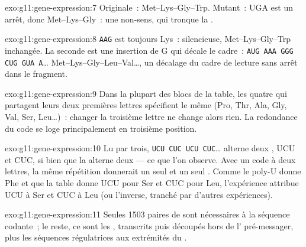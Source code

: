 \begin{solution}{exo:g11:gene-expression:7}
Originale~: Met--Lys--Gly--Trp. Mutant~: UGA est un arrêt, donc
Met--Lys--Gly~: une  non-sens, qui tronque la .
\end{solution}

\begin{solution}{exo:g11:gene-expression:8}
\texttt{AAG} est toujours Lys~: silencieuse, Met--Lys--Gly--Trp
inchangée. La seconde est une insertion de G qui décale le cadre~:
\texttt{AUG AAA GGG
CUG GUA A}\dots{} Met--Lys--Gly--Leu--Val\dots, un décalage du cadre de
lecture sans arrêt dans le fragment.
\end{solution}

\begin{solution}{exo:g11:gene-expression:9}
Dans la plupart des blocs de la table, les quatre  qui partagent
leurs deux premières lettres spécifient le même  (Pro, Thr,
Ala, Gly, Val, Ser, Leu\dots)~: changer la troisième lettre ne change
alors rien. La redondance du code se loge principalement en troisième
position.
\end{solution}

\begin{solution}{exo:g11:gene-expression:10}
Lu par trois, \texttt{UCU CUC UCU CUC}\dots{} alterne deux , UCU
et CUC, si bien que la  alterne deux  --- ce que
l'on observe. Avec un code à deux lettres, la même répétition donnerait
un seul  et un seul . Comme le poly-U donne Phe et que
la table donne UCU pour Ser et CUC pour Leu, l'expérience attribue UCU
à Ser et CUC à Leu (ou l'inverse, tranché par d'autres expériences).
\end{solution}

\begin{solution}{exo:g11:gene-expression:11}
Seules 1503 paires de  sont nécessaires à la séquence codante~; le
reste, ce sont les , transcrits puis découpés hors de l'
pré-messager, plus les séquences régulatrices aux extrémités du .
\end{solution}

